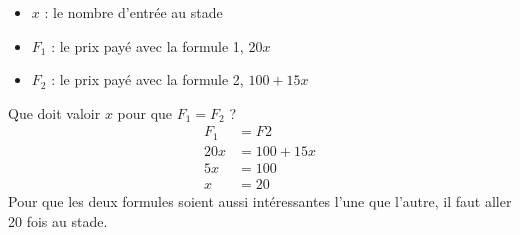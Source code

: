 %
%
    \begin{itemize}[label=\faAngleRight]
        \item $x$ : le nombre d'entrée au stade
        \item $F_1$ : le prix payé avec la formule 1, $20x$
        \item $F_2$ : le prix payé avec la formule 2, $100 + 15x$
    \end{itemize}
    Que doit valoir $x$ pour que $F_1=F_2$ ?
    \begin{align*}
        F_1 & = F2      \\
        20x & = 100+15x \\
        5x  & = 100     \\
        x   & = 20
    \end{align*}
    Pour que les deux formules soient aussi intéressantes l'une que l'autre,
    il faut aller 20 fois au stade.
